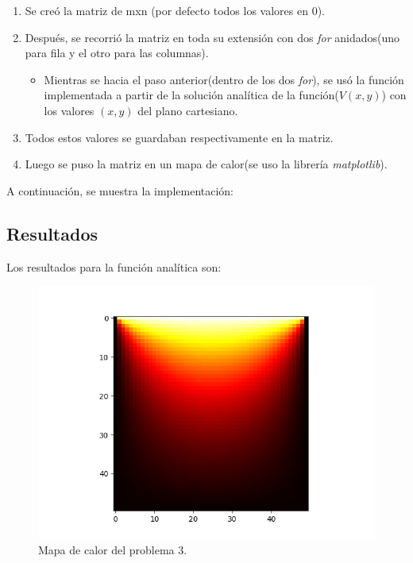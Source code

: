 \documentclass[a4paper,12pt]{article}
\newcommand{\eq}[1]{$#1$}
\begin{document}
    \begin{enumerate}
        \item Se creó la matriz de m{\scriptsize x}n (por defecto todos los valores en 0).
        \item Después, se recorrió la matriz en toda su extensión con dos \emph{for} anidados(uno para fila y el otro para las columnas).
        \begin{itemize}
            \item Mientras se hacia el paso anterior(dentro de 
            los dos \emph{for}), se usó la función implementada a partir 
            de la solución analítica de la función(\eq{V(x,y)}) 
            con los valores \eq{(x,y)} del plano cartesiano.
        \end{itemize}
        \item Todos estos valores se guardaban respectivamente en la matriz.
        \item Luego se puso la matriz en un mapa de calor(se uso la librería \emph{matplotlib}).
    \end{enumerate}

    A continuación, se muestra la implementación:
    
    

    \subsection{Resultados}
    Los resultados para la función analítica son:
    \begin{figure}[h]
        \centering
        \includegraphics[scale=0.8]{eje3_demostr1.PNG}
        \caption{Mapa de calor del problema 3.}
    \end{figure}
\end{document}
